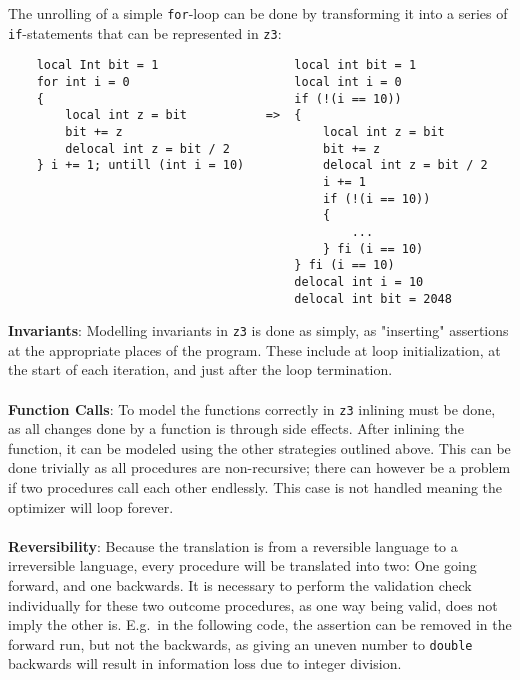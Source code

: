 The unrolling of a simple \texttt{for}-loop can be done by transforming it into a series of
\texttt{if}-statements that can be represented in \texttt{z3}:
\begin{verbatim}
    local Int bit = 1                   local int bit = 1
    for int i = 0                       local int i = 0
    {                                   if (!(i == 10))
        local int z = bit           =>  {
        bit += z                            local int z = bit   
        delocal int z = bit / 2             bit += z
    } i += 1; untill (int i = 10)           delocal int z = bit / 2
                                            i += 1
                                            if (!(i == 10))
                                            {
                                                ...
                                            } fi (i == 10)
                                        } fi (i == 10)
                                        delocal int i = 10
                                        delocal int bit = 2048
\end{verbatim}
\noindent
\textbf{Invariants}:
Modelling invariants in \texttt{z3} is done as simply, as "inserting" assertions at the appropriate
places of the program. These include at loop initialization, at the start of each iteration, and
just after the loop termination.
\\
\\
\textbf{Function Calls}:
To model the functions correctly in \texttt{z3} inlining must be done, as all changes done
by a function is through side effects. After inlining the function, it can be modeled using the
other strategies outlined above. This can be done trivially as all procedures are non-recursive;
there can however be a problem if two procedures call each other endlessly. This case is not handled
meaning the optimizer will loop forever.
\\
\\
\textbf{Reversibility}:
Because the translation is from a reversible language to a irreversible language, every procedure
will be translated into two: One going forward, and one backwards. It is necessary to perform
the validation check individually for these two outcome procedures, as one way being valid, does
not imply the other is. E.g.\ in the following code, the assertion can be removed in the
forward run, but not the backwards, as giving an uneven number to \texttt{double} backwards will
result in information loss due to integer division.

